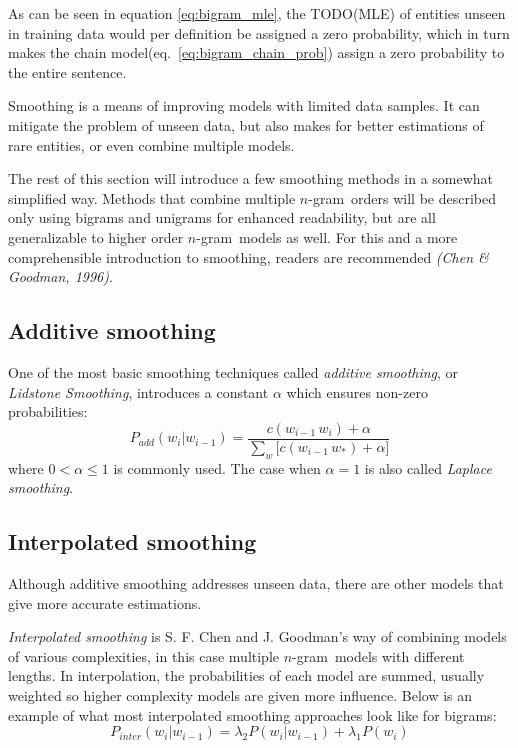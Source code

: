 \documentclass[a4paper,11pt]{kth-mag}
\newcommand{\ngram}{$n$-gram}
\newcommand{\gls}[1]{TODO(#1)}
\begin{document}
As can be seen in equation \ref{eq:bigram_mle}, the \gls{MLE} of entities unseen in
training data would per definition be assigned a zero probability, which in turn makes
the chain model(eq.~\ref{eq:bigram_chain_prob}) assign a zero probability to the entire
sentence\cite{chen_goodman}.

Smoothing is a means of improving models with limited data samples.
It can mitigate the problem of unseen data,
but also makes for better estimations of rare entities, or even combine multiple models.

The rest of this section will introduce a few smoothing methods in a somewhat simplified way.
Methods that combine multiple \ngram~orders will be described only using bigrams and
unigrams for enhanced readability,
but are all generalizable to higher order \ngram~models as well.
For this and a more comprehensible introduction to smoothing,
readers are recommended \emph{(Chen \& Goodman, 1996)}.

\subsection{Additive smoothing}
One of the most basic smoothing techniques called \emph{additive smoothing},
or \emph{Lidstone Smoothing}, introduces a constant $\alpha$ which ensures
non-zero probabilities\cite{chen_goodman}:
\begin{equation} \label{eq:additive_smoothing}
P_{add}(w_i|w_{i-1}) = \frac{c(w_{i-1}\,w_i)+\alpha}{\sum_{w} \big[c(w_{i-1}\, w_*)+\alpha\big]}
\end{equation}
where $0 < \alpha \leq 1$ is commonly used. The case when $\alpha=1$ is also called \emph{Laplace smoothing}\cite{nlp_book}.


\subsection{Interpolated smoothing}
Although additive smoothing addresses unseen data, there are other models that give more accurate estimations.

\emph{Interpolated smoothing} is S. F. Chen and J. Goodman's way of combining models of various complexities,
in this case multiple \ngram~models with different lengths. In interpolation, the probabilities of each model are summed, usually weighted so higher complexity models are given more influence\cite{chen_goodman}.
Below is an example of what most interpolated smoothing approaches look like for bigrams:
\begin{equation}\label{eq:interpolated_smoothing}
  P_{inter}(w_i|w_{i-1}) =
  \lambda_2 P(w_i|w_{i-1}) + \lambda_1 P(w_i)
\end{equation}
\end{document}
